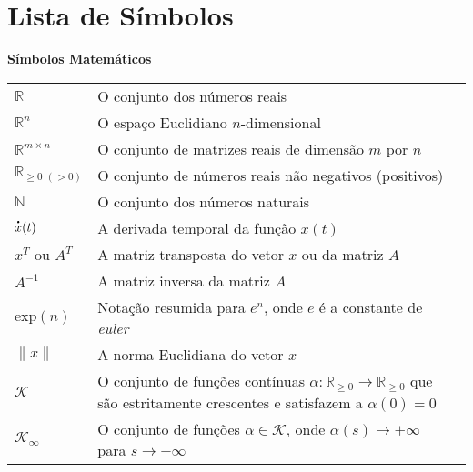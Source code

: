 
\chapter*{Lista de Símbolos}

\begin{spacing}{1.45}

\noindent \textbf{Símbolos Matemáticos}

\begin{longtable}{L{3.5cm}L{12cm}L{\textwidth}}

$\mathbb{R}$ & O conjunto dos números reais & \\[8pt]

$\mathbb{R}^n$ & O espaço Euclidiano $n$-dimensional & \\[8pt]  

$\mathbb{R}^{m \times n}$ & O conjunto de matrizes reais de dimensão $m$ por $n$ & \\[8pt]

$\mathbb{R}_{\geq 0 \,\, (> 0)}$ & O conjunto de números reais não negativos (positivos) & \\[8pt]

$\mathbb{N}$ & O conjunto dos números naturais & \\[8pt]

$\dt{x}(t)$ & A derivada temporal da função $x(t)$ & \\[8pt]

$x^T$ ou $A^T$ & A matriz transposta do vetor $x$ ou da matriz $A$ & \\[8pt]

$A^{-1}$ & A matriz inversa da matriz $A$ & \\[8pt]

$\mathrm{exp}(n)$ & Notação resumida para $e^n$, onde $e$ é a constante de \textit{euler} & \\[8pt]

$\|x\|$ & A norma Euclidiana do vetor $x$ & \\[8pt]

$\mathcal{K}$ & O conjunto de funções contínuas $\alpha : \mathbb{R}_{\geq 0} \rightarrow \mathbb{R}_{\geq 0}$ que são estritamente
crescentes e satisfazem a $\alpha(0) = 0$ & \\[8pt]

$\mathcal{K}_{\infty}$ & O conjunto de funções $\alpha \in \mathcal{K}$, onde $\alpha(s) \rightarrow + \infty$ para $s \rightarrow + \infty$ & \\[12pt]


\end{longtable}
\end{spacing}

